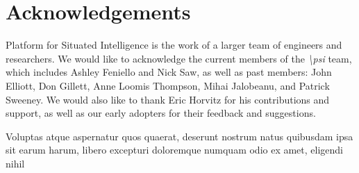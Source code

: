 \documentclass[letterpaper]{article} %
\newcommand{\psif}{\emph{\textbackslash psi} }
\begin{document}
\vspace{-4.01mm}
\section{Acknowledgements}
Platform for Situated Intelligence is the work of a larger team of engineers and researchers. We would like to acknowledge the current members of the \psif team, which includes Ashley Feniello and Nick Saw, as well as past members: John Elliott, Don Gillett, Anne Loomis Thompson, Mihai Jalobeanu, and Patrick Sweeney. We would also like to thank Eric Horvitz for his contributions and support, as well as our early adopters for their feedback and suggestions.


Voluptas atque aspernatur quos quaerat, deserunt nostrum natus quibusdam ipsa sit earum harum, libero excepturi doloremque numquam odio ex amet, eligendi nihil

\end{document}
